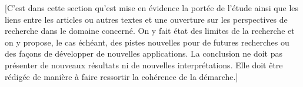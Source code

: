[C’est dans cette section qu’est mise en évidence la portée de l’étude ainsi que les liens entre les articles ou autres textes et une ouverture sur les perspectives de recherche dans le domaine concerné. On y fait état des limites de la recherche et on y propose, le cas échéant, des pistes nouvelles pour de futures recherches ou des façons de développer de nouvelles applications. La conclusion ne doit pas présenter de nouveaux résultats ni de nouvelles interprétations. Elle doit être rédigée de manière à faire ressortir la cohérence de la démarche.]